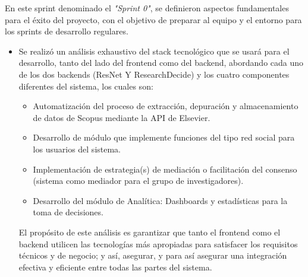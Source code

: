En este sprint denominado el \textit{"Sprint 0"}, se definieron aspectos fundamentales para el éxito del proyecto, con el objetivo de preparar al equipo y el entorno para los sprints de desarrollo regulares. 

\begin{itemize}
    \item Se realizó un análisis exhaustivo del stack tecnológico que se usará para el desarrollo, tanto del lado del frontend como del backend, abordando cada uno de los dos backends (ResNet Y ResearchDecide) y los cuatro componentes diferentes del sistema, los cuales son:
    \begin{itemize}
        \item Automatización del proceso de extracción, depuración y almacenamiento de datos de Scopus mediante la API de Elsevier.
        \item Desarrollo de módulo que implemente funciones del tipo red social para los usuarios del sistema.
        \item Implementación de estrategia(s) de mediación o facilitación del consenso (sistema como mediador para el grupo de investigadores).
        \item Desarrollo del módulo de Analítica: Dashboards y estadísticas para la toma de decisiones.
    \end{itemize}
    El propósito de este análisis es garantizar que tanto el frontend como el backend utilicen las tecnologías más apropiadas para satisfacer los requisitos técnicos y de negocio; y así, asegurar, y para así asegurar una integración efectiva y eficiente entre todas las partes del sistema.
    


\end{itemize}
